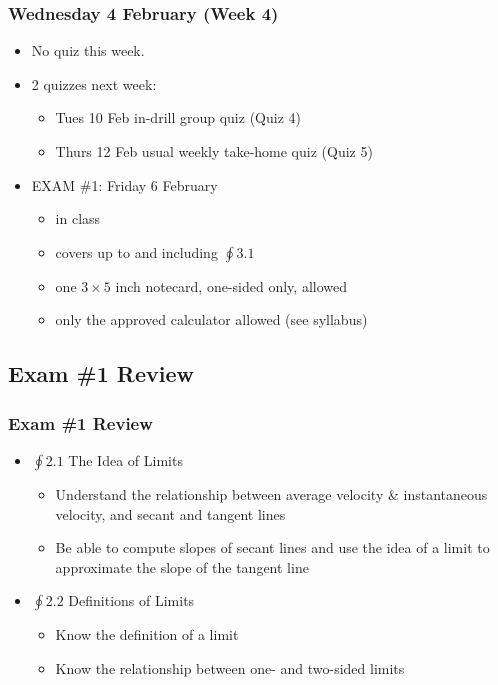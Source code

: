 \documentclass[14pt]{beamer}
\begin{document}
\begin{frame}
\frametitle{Wednesday 4 February (Week 4)}
\begin{itemize}
\item No quiz this week.

\vspace{0.5pc}
\item 2 quizzes next week:
	\begin{itemize}
	\item Tues 10 Feb in-drill group quiz (Quiz 4)
	\item Thurs 12 Feb usual weekly take-home quiz (Quiz 5)
	\end{itemize}
	
\vspace{0.5pc}
\item EXAM \#1: Friday 6 February 
	\begin{itemize}
	\item in class
	\item covers up to and including $\oint 3.1$
	\item one $3\times 5$ inch notecard, one-sided only, allowed
	\item only the approved calculator allowed (see syllabus)
	\end{itemize}
\end{itemize}
\end{frame}

\subsection{Exam \#1 Review}

\begin{frame}
\frametitle{Exam \#1 Review}
\begin{itemize}
\item $\oint 2.1$  The Idea of Limits
	\begin{itemize}
	\item Understand the relationship between average velocity \& instantaneous velocity, and secant and tangent lines
	\item Be able to compute slopes of secant lines and use the idea of a limit to approximate the slope of the tangent line
	\end{itemize}
\item $\oint 2.2$ Definitions of Limits
	\begin{itemize}
	\item Know the definition of a limit
	\item Know the relationship between one- and two-sided limits
	\end{itemize}
\end{itemize}
\end{frame}
\end{document}
